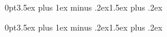 \titlespacing*{\section} {0pt}{3.5ex plus 1ex minus .2ex}{1.5ex plus .2ex}	

\titlespacing*{\subsection} {0pt}{3.5ex plus 1ex minus .2ex}{1.5ex plus .2ex}



